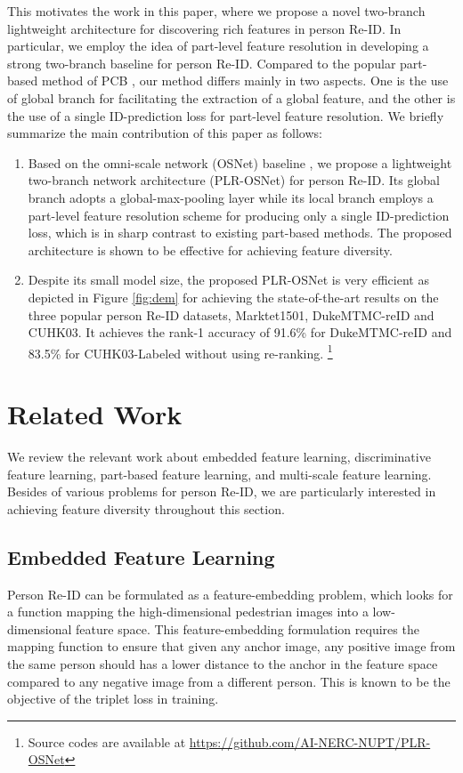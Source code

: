 \documentclass[journal]{IEEEtran}
\begin{document}
This motivates the work in this paper, where we propose a novel two-branch lightweight architecture for discovering rich features in person Re-ID. In particular, we employ the idea of part-level feature resolution in developing a strong two-branch baseline for person Re-ID. Compared to the popular part-based method of PCB \cite{sun2018beyond}, our method differs mainly in two aspects. One is the use of global branch for facilitating the extraction of a global feature, and the other is the use of a single ID-prediction loss for part-level feature resolution. We briefly summarize the main contribution of this paper as follows:
\begin{enumerate}

\item
Based on the omni-scale network (OSNet) baseline \cite{zhou2019OSNet}, we propose a lightweight two-branch network architecture (PLR-OSNet) for person Re-ID. Its global branch adopts a global-max-pooling layer while its local branch employs a part-level feature resolution scheme for producing only a single ID-prediction loss, which is in sharp contrast to existing part-based methods. The proposed architecture is shown to be effective for achieving feature diversity.

\item
  Despite its small model size, the proposed PLR-OSNet is very efficient as depicted in Figure \ref{fig:dem} for achieving the state-of-the-art results \cite{li2018harmonious,wang2018mancs,chen2019ABD,chen2019MHN,dai2019BDB,he2019Bag,quan2019Auto,sun2018beyond,zheng2019pyramid} on the three popular person Re-ID datasets, Marktet1501, DukeMTMC-reID and CUHK03. It achieves the rank-1 accuracy of 91.6\% for DukeMTMC-reID and 83.5\% for CUHK03-Labeled without using re-ranking. \footnote{Source codes are available at \href{url}{https://github.com/AI-NERC-NUPT/PLR-OSNet}}

\end{enumerate}

\section{Related Work}
\label{gen_inst}
We review the relevant work about embedded feature learning, discriminative feature learning, part-based
feature learning, and multi-scale feature learning. Besides of various problems for person Re-ID, we are particularly interested in achieving feature diversity throughout this section.

\subsection{Embedded Feature Learning}
Person Re-ID can be formulated as a feature-embedding problem, which looks for a function mapping the high-dimensional pedestrian images into a low-dimensional feature space. This feature-embedding formulation requires the mapping function to ensure that given any anchor image, any positive image from the same person should has a lower distance to the anchor in the feature space compared to any negative image from a different person. This is known to be the objective of the triplet loss in training.
\end{document}
